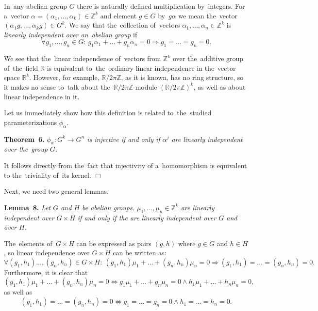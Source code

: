 \documentclass[twoside]{article}
\begin{document}
In~any abelian group $G$ there is naturally defined multiplication by~integers.
For a~vector $\alpha = (\alpha_1, \ldots, \alpha_k) \in \mathbb{Z}^k$ and element $g \in G$
by~$g \alpha$ we mean the~vector $(\alpha_1 g, \ldots, \alpha_k g) \in G^k$. We say that
the~collection of~vectors $\alpha_1, \ldots, \alpha_n \in \mathbb{Z}^k$ is \textit{linearly independent
over an~abelian group} if
$$
    \forall g_1, \ldots, g_n \in G{:}\ g_1 \alpha_1 + \ldots + g_n \alpha_n = 0 \Rightarrow g_1 = \ldots = g_n = 0.
$$

We see that the~linear independence of~vectors from $\mathbb{Z}^k$ over the~additive group of~the~field $\mathbb{R}$
is equivalent to~the~ordinary linear independence in the~vector space $\mathbb{R}^k$. However, for example,
$\mathbb{R} / 2 \pi \mathbb{Z}$, as it is known, has no ring structure, so it makes no sense
to~talk about the~$\mathbb{R} / 2 \pi \mathbb{Z}$-module $(\mathbb{R} / 2 \pi \mathbb{Z})^k$,
as well as about linear independence in it.

Let us immediately show how this definition is related to~the~studied parameterizations $\phi_\alpha$.

\medskip\noindent\textbf{Theorem~6.}\emph{
    $\phi_\alpha : G^k \rightarrow G^n$ is injective if and only if $\alpha^j$ are linearly independent over the~group $G$.
}\medskip

 It follows directly from the~fact that injectivity of a~homomorphism is equivalent to the~triviality of~its kernel.
\hfill$\Box$\medskip

Next, we need two general lemmas.

\medskip\noindent\textbf{Lemma~8.}\emph{
    Let $G$ and $H$ be abelian groups. $\mu_1,\allowbreak \ldots,\allowbreak \mu_n \in \mathbb{Z}^k$ are linearly independent
    over $G \times H$ if and only if the are linearly independent over $G$ and over $H$.
}\medskip

    The~elements of~$G \times H$ can be expressed as pairs $(g, h)$ where $g \in G$ and $h \in H$,
    so linear independence over $G \times H$ can be written as:
    $$
        \forall (g_1, h_1) \ldots, (g_n, h_n) \in G \times H{:}\ (g_1, h_1) \mu_1 + \ldots + (g_n, h_n) \mu_n = 0 \Rightarrow (g_1, h_1) = \ldots = (g_n, h_n) = 0.
    $$
    Furthermore, it is clear that
    $$
        (g_1, h_1) \mu_1 + \ldots + (g_n, h_n) \mu_n = 0 \Leftrightarrow g_1 \mu_1 + \ldots + g_n \mu_n = 0 \wedge h_1 \mu_1 + \ldots + h_n \mu_n = 0,
    $$
    as well as
    $$
        (g_1, h_1) = \ldots = (g_n, h_n) = 0 \Leftrightarrow g_1 = \ldots = g_n = 0 \wedge h_1 = \ldots = h_n = 0.
    $$
\end{document}
